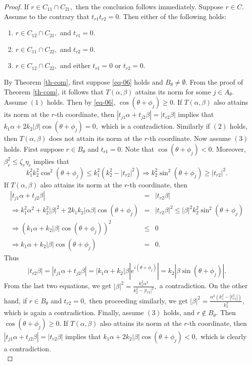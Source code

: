 \documentclass{amsart}
\theoremstyle{definition}
\theoremstyle{remark}
\numberwithin{equation}{section}
\begin{document}
\begin{proof}
If $r\in C_{11}\cap C_{21},$ then the conclusion follows immediately. Suppose $r\in C.$ Assume to the contrary that $t_{r1}t_{r2}=0.$ Then either of the following holds:
\begin{enumerate}
	\item $r\in C_{12}\cap C_{21},$ and $t_{r1}=0.$
	\item $r\in C_{11}\cap C_{22},$ and $t_{r2}=0.$
	\item $r\in C_{12}\cap C_{22},$ and either $t_{r1}=0$ or $t_{r2}=0.$
\end{enumerate}
By Theorem  \ref{th-com}, first suppose  \eqref{eq-06} holds and $B_\theta\neq \emptyset$. From the proof of Theorem  \ref{th-com}, it follows that $T(\alpha,\beta)$ attains its norm for some $j\in A_\theta.$   Assume $(1)$ holds. Then by  \eqref{eq-06}, $\cos(\theta+\phi_j)\geq 0.$
 If $T(\alpha,\beta)$ also attains its norm at the $r$-th coordinate, then $|t_{j1}\alpha+t_{j2}\beta|=|t_{r2}\beta|$ implies that $k_1\alpha+2k_2|\beta|\cos(\theta+\phi_j)=0,$ which is a contradiction. Similarly if $(2)$ holds, then $T(\alpha,\beta)$ does not attain its norm at the $r$-th coordinate. Now assume  $(3)$ holds. First suppose $r\in  B_{\theta}$ and $t_{r1}=0.$ Note that $\cos(\theta+\phi_j)<0.$ Moreover, $\beta_r^2\leq \zeta_r\eta_r$ implies that $$k_1^2k_2^2 \cos^2(\theta+\phi_j)\leq k_1^2(k_2^2-|t_{r2}|^2)\Rightarrow k_2^2\sin^2(\theta+\phi_j)\geq |t_{r2}|^2.$$  If $T(\alpha,\beta)$ also attains its norm at the $r$-th coordinate, then  
\begin{eqnarray*}
	|t_{j1}\alpha+t_{j2}\beta|&=&|t_{r2}\beta|\\
	\Rightarrow k_1^2\alpha^2+k_2^2|\beta|^2+2k_1k_2|\alpha\beta|\cos(\theta+\phi_j)&=&|t_{r2}\beta|^2\leq |\beta|^2k_2^2\sin^2(\theta+\phi_j)\\
	\Rightarrow (k_1\alpha+k_2|\beta|\cos(\theta+\phi_j))^2&\leq &0\\
		\Rightarrow k_1\alpha+k_2|\beta|\cos(\theta+\phi_j)&=&0.
\end{eqnarray*}
Thus
\[|t_{r2}\beta|=|t_{j1}\alpha+t_{j2}\beta|=|k_1\alpha+k_2|\beta|e^{i(\theta+\phi_j)}|=k_2|\beta\sin(\theta+\phi_j)|.\]
From the last two equations, we get 
$|\beta|^2=\frac{k_1^2\alpha^2}{k_2^2-|t_{r2}|^2},$ a contradiction. On the other hand, if  $r\in B_{\theta}$ and $t_{r2}=0,$ then proceeding similarly,  we get $|\beta|^2=\frac{\alpha^2(k_1^2-|t_{r1}^2|)}{k_2^2},$ which is again a contradiction. Finally, assume $(3)$ holds, and $r\notin  B_{\theta}.$ Then $\cos(\theta+\phi_j)\geq0.$  If $T(\alpha,\beta)$ also attains its norm at the $r$-th coordinate, then $|t_{j1}\alpha+t_{j2}\beta|=|t_{r2}\beta|$ implies that $k_1\alpha+2k_2|\beta|\cos(\theta+\phi_j)<0,$ which is clearly a contradiction. \\


\end{proof}
\end{document}
